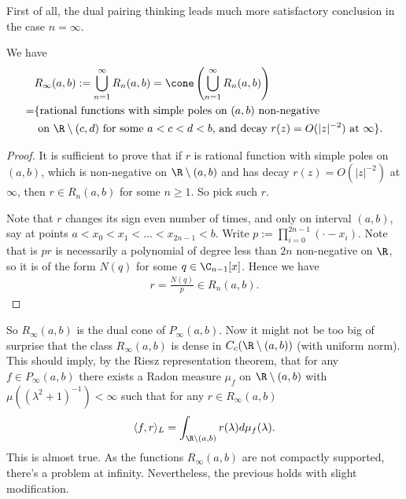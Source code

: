 First of all, the dual pairing thinking leads much more satisfactory conclusion in the case $n = \infty$.

\begin{lem}
	We have
	\begin{align*}
		&R_{\infty}(a, b) := \bigcup_{n = 1}^{\infty} R_{n}(a, b) = \cone\left( \bigcup_{n = 1}^{\infty} R_{n}(a, b)\right) \\
		= &\{ \text{rational functions with simple poles on $(a, b)$ non-negative} \\
		& \text{ on $\R \setminus (c, d)$ for some $a < c < d < b$, and decay $r(z) = O(|z|^{-2})$ at $\infty$} \}.
	\end{align*}
\end{lem}
\begin{proof}
	It is sufficient to prove that if $r$ is rational function with simple poles on $(a, b)$, which is non-negative on $\R \setminus (a, b)$ and has decay $r(z) = O(|z|^{-2})$ at $\infty$, then $r \in R_{n}(a, b)$ for some $n \geq 1$. So pick such $r$.

	Note that $r$ changes its sign even number of times, and only on interval $(a, b)$, say at points $a < x_{0} < x_{1} < \ldots < x_{2 n - 1} < b$. Write $p := \prod_{i = 0}^{2 n - 1} (\cdot - x_{i})$. Note that is $p r$ is necessarily a polynomial of degree less than $2 n$ non-negative on $\R$, so it is of the form $N(q)$ for some $q \in \C_{n - 1}[x]$. Hence we have
	\begin{align*}
		r = \frac{N(q)}{p} \in R_{n}(a, b).
	\end{align*}
\end{proof}

So $R_{\infty}(a, b)$ is the dual cone of $P_{\infty}(a, b)$. Now it might not be too big of surprise that the class $R_{\infty}(a, b)$ is dense in $C_{c}(\R \setminus (a, b))$ (with uniform norm). This should imply, by the Riesz representation theorem, that for any $f \in P_{\infty}(a, b)$ there exists a Radon measure $\mu_{f}$ on $\R \setminus (a, b)$ with $\mu((\lambda^2 + 1)^{-1}) < \infty$ such that for any $r \in R_{\infty}(a, b)$
\begin{align*}
	\langle f, r \rangle_{L} = \int_{\R \setminus (a, b)} r(\lambda) d \mu_{f}(\lambda).
\end{align*}
This is almost true. As the functions $R_{\infty}(a, b)$ are not compactly supported, there's a problem at infinity.  Nevertheless, the previous holds with slight modification.

